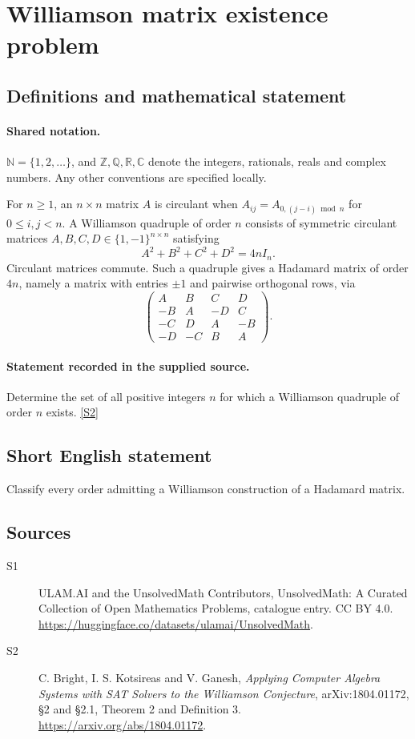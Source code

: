 \documentclass[11pt]{article}
\newcommand{\sref}[2]{\hyperlink{source:#1:#2}{[S#2]}}
\begin{document}
\section{Williamson matrix existence problem}\label{statement}

\subsection{Definitions and mathematical statement}

\paragraph{Shared notation.}$\mathbb N=\{1,2,\ldots\}$, and $\mathbb Z,\mathbb Q,\mathbb R,\mathbb C$ denote the integers, rationals, reals and complex numbers. Any other conventions are specified locally.


For $n\geq1$, an $n\times n$ matrix $A$ is circulant when $A_{ij}=A_{0,(j-i)\bmod n}$ for $0\leq i,j<n$. A Williamson quadruple of order $n$ consists of symmetric circulant matrices $A,B,C,D\in\{1,-1\}^{n\times n}$ satisfying
\[A^2+B^2+C^2+D^2=4nI_n.
\]
Circulant matrices commute. Such a quadruple gives a Hadamard matrix of order $4n$, namely a matrix with entries $\pm1$ and pairwise orthogonal rows, via
\[\begin{pmatrix}A&B&C&D\\-B&A&-D&C\\-C&D&A&-B\\-D&-C&B&A\end{pmatrix}.
\]
\paragraph{Statement recorded in the supplied source.}
Determine the set of all positive integers $n$ for which a Williamson quadruple of order $n$ exists. \sref{statement}{2}
\subsection{Short English statement}
Classify every order admitting a Williamson construction of a Hadamard matrix.
\subsection{Sources}
\begin{description}
\item[\hypertarget{source:statement:1}{S1}] ULAM.AI and the UnsolvedMath Contributors, UnsolvedMath: A Curated Collection of Open Mathematics Problems, catalogue entry. CC BY 4.0. \url{https://huggingface.co/datasets/ulamai/UnsolvedMath}.
\item[\hypertarget{source:statement:2}{S2}] C. Bright, I. S. Kotsireas and V. Ganesh, \emph{Applying Computer Algebra Systems with SAT Solvers to the Williamson Conjecture}, arXiv:1804.01172, §2 and §2.1, Theorem 2 and Definition 3. \url{https://arxiv.org/abs/1804.01172}.
\end{description}
\label{end:statement}
\end{document}
